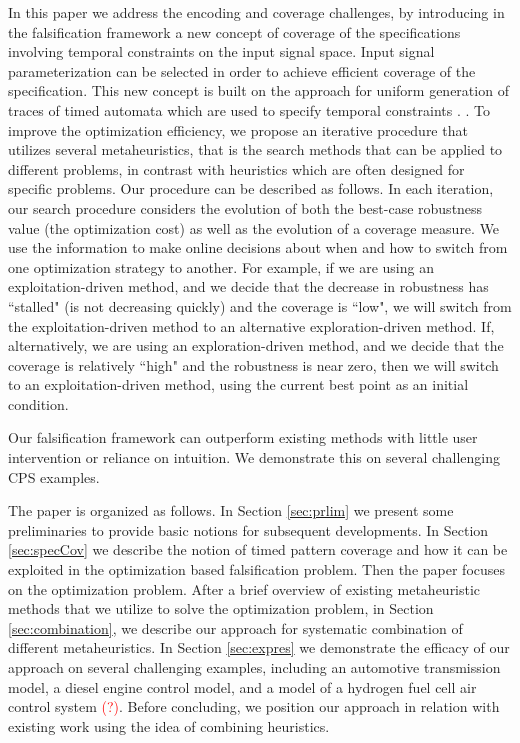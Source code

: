 In this paper we address the encoding and coverage challenges, by introducing in the falsification framework a new concept of
coverage of the specifications involving temporal constraints on the input signal space. Input signal parameterization can be selected in order to achieve
efficient coverage of the specification. This new concept is built on the approach for uniform
generation of traces of timed automata which are used to specify temporal constraints  \cite{}.
. To improve the optimization efficiency, we propose an iterative procedure that utilizes several
metaheuristics, that is the search methods that can be applied to
different problems, in contrast with heuristics which are often
designed for specific problems. Our procedure can be described as follows. 
In each iteration, our
search procedure considers the evolution of both the best-case
robustness value (the optimization cost) as well as the evolution of a
coverage measure.  We use the information to make online decisions
about when and how to switch from one optimization strategy to
another.  For example, if we are using an exploitation-driven method,
and we decide that the decrease in robustness has ``stalled" (is not
decreasing quickly) and the coverage is ``low", we will switch from
the exploitation-driven method to an alternative exploration-driven
method.  If, alternatively, we are using an exploration-driven method,
and we decide that the coverage is relatively ``high" and the
robustness is near zero, then we will switch to an exploitation-driven
method, using the current best point as an initial condition.
 
Our falsification framework can outperform existing methods with little user intervention or reliance on intuition. We demonstrate this on several 
challenging CPS examples.

The paper is organized as follows. In Section \ref{sec:prlim} we present some preliminaries to provide basic notions for subsequent developments. In Section \ref{sec:specCov} we describe the notion of timed pattern coverage and how it can be exploited in the optimization based falsification problem. Then the paper focuses on the optimization problem. After a brief overview of existing metaheuristic methods that we utilize to solve the optimization problem, in Section \ref{sec:combination}, we describe our approach for systematic combination of different metaheuristics. In Section \ref{sec:expres} we demonstrate the efficacy of our approach on several challenging examples, including an automotive transmission model, a diesel engine control model, and a model of a hydrogen fuel cell air control system \textcolor{red}{(?)}. Before concluding, we position our approach in relation with existing work using the idea of combining heuristics. 

